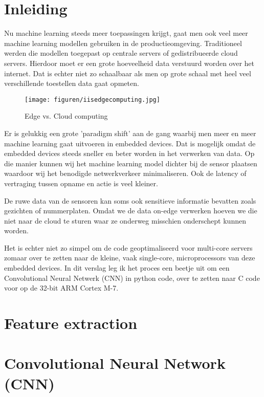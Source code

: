 \section{Inleiding}

Nu machine learning steeds meer toepassingen krijgt, gaat men ook veel meer machine learning modellen gebruiken in de productieomgeving.
Traditioneel werden die modellen toegepast op centrale servers of gedistribueerde cloud servers. Hierdoor moet er een grote hoeveelheid data verstuurd worden over het internet.
Dat is echter niet zo schaalbaar als men op grote schaal met heel veel verschillende toestellen data gaat opmeten. %

\begin{figure}[ht]
	\centering
	\texttt{[image: figuren/iisedgecomputing.jpg]}
	\caption{Edge vs. Cloud computing}
	\cite{flir-edge-computing}
	\label{fig:edge-vs-cloud}
\end{figure}

Er is gelukkig een grote 'paradigm shift' aan de gang waarbij men meer en meer machine learning gaat uitvoeren in embedded devices.
Dat is mogelijk omdat de embedded devices steeds sneller en beter worden in het verwerken van data.
Op die manier kunnen wij het machine learning model dichter bij de sensor plaatsen waardoor wij het benodigde netwerkverkeer minimaliseren.
Ook de latency of vertraging tussen opname en actie is veel kleiner. \cite{flir-edge-computing}

De ruwe data van de sensoren kan soms ook sensitieve informatie bevatten zoals gezichten of nummerplaten. Omdat we de data on-edge verwerken hoeven we die niet naar de cloud te sturen waar ze onderweg misschien onderschept kunnen worden. \cite{flir-edge-computing}

Het is echter niet zo simpel om de code geoptimaliseerd voor multi-core servers zomaar over te zetten naar de kleine, vaak single-core, microprocessors van deze embedded devices. In dit verslag leg ik het proces een beetje uit om een Convolutional Neural Netwerk (CNN) in python code, over te zetten naar C code voor op de 32-bit ARM Cortex M-7.

\section{Feature extraction}

\section{Convolutional Neural Network (CNN)}

